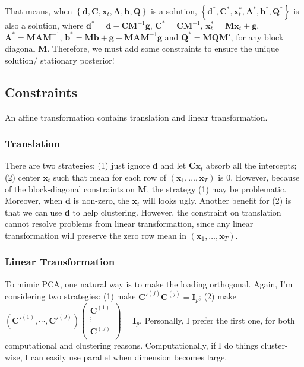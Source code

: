 \documentclass[]{article}
\begin{document}
That means, when \(\left\{ \mathbf{d},\mathbf{C},\mathbf{x}_t,\mathbf{A},\mathbf{b},\mathbf{Q} \right\}\) is a solution,
\(\left\{ \mathbf{d}^*,\mathbf{C}^*,\mathbf{x}^*_t,\mathbf{A}^*,\mathbf{b}^*,\mathbf{Q}^* \right\}\) is also a
solution, where
\(\mathbf{d}^* = \mathbf{d} - \mathbf{C}\mathbf{M}^{- 1}\mathbf{g}\),
\(\mathbf{C}^* = \mathbf{CM}^{- 1}\), \(\mathbf{x}_{t}^{*} = \mathbf{M}\mathbf{x}_{t} + \mathbf{g}\),
\(\mathbf{A}^* = \mathbf{MAM}^{- 1}\),
\(\mathbf{b}^* = \mathbf{Mb} + \mathbf{g} - \mathbf{MAM}^{- 1}\mathbf{g}\)
and \(\mathbf{Q}^* = \mathbf{MQM}'\), for any block diagonal \(\mathbf{M}\). Therefore, we must add some constraints to ensure the unique solution/ stationary
posterior!

\subsection{Constraints}
An affine transformation contains translation and linear transformation. 

\subsubsection{Translation}
There are two strategies: (1) just ignore \(\mathbf{d}\) and let \(\mathbf{Cx}_{t}\)
absorb all the intercepts; (2) center \(\mathbf{x}_t\) such that mean for each
row of \((\mathbf{x}_{1},\ldots,\mathbf{x}_{T})\) is 0. However, because of the block-diagonal constraints on $\mathbf{M}$, the strategy (1) may be problematic. Moreover, when $\mathbf{d}$ is non-zero, the \(\mathbf{x}_t\) will looks ugly. Another benefit for (2) is that we can use $\mathbf{d}$ to help clustering. However, the constraint on translation cannot resolve problems from linear transformation, since any linear transformation will preserve the zero row mean in \((\mathbf{x}_{1},\ldots,\mathbf{x}_{T})\).

\subsubsection{Linear Transformation}
To mimic PCA, one natural way is to make the loading orthogonal. Again, I'm considering two strategies: (1) make
\(\mathbf{C}'^{(j)}\mathbf{C}^{(j)} = \mathbf{I}_{p}\); (2) make \( (\mathbf{C}'^{(1)},\cdots, \mathbf{C}'^{(J)})
\begin{pmatrix}
	\mathbf{C}^{(1)} \\
	\vdots \\
	\mathbf{C}^{(J)} \\
\end{pmatrix} = \mathbf{I}_{p}\). Personally, I prefer the first one, for both computational and clustering reasons. Computationally, if I do things cluster-wise, I can easily use parallel when dimension becomes large.
\end{document}
